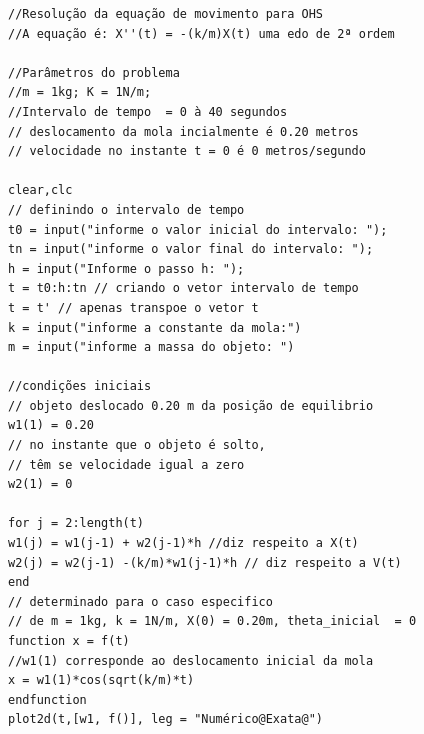 \begin{verbatim}
//Resolução da equação de movimento para OHS
//A equação é: X''(t) = -(k/m)X(t) uma edo de 2ª ordem

//Parâmetros do problema
//m = 1kg; K = 1N/m; 
//Intervalo de tempo  = 0 à 40 segundos 
// deslocamento da mola incialmente é 0.20 metros
// velocidade no instante t = 0 é 0 metros/segundo

clear,clc
// definindo o intervalo de tempo
t0 = input("informe o valor inicial do intervalo: ");
tn = input("informe o valor final do intervalo: ");
h = input("Informe o passo h: ");
t = t0:h:tn // criando o vetor intervalo de tempo
t = t' // apenas transpoe o vetor t
k = input("informe a constante da mola:")
m = input("informe a massa do objeto: ")

//condições iniciais
// objeto deslocado 0.20 m da posição de equilibrio
w1(1) = 0.20 
// no instante que o objeto é solto, 
// têm se velocidade igual a zero
w2(1) = 0 

for j = 2:length(t)
w1(j) = w1(j-1) + w2(j-1)*h //diz respeito a X(t)
w2(j) = w2(j-1) -(k/m)*w1(j-1)*h // diz respeito a V(t)
end
// determinado para o caso especifico 
// de m = 1kg, k = 1N/m, X(0) = 0.20m, theta_inicial  = 0
function x = f(t)
//w1(1) corresponde ao deslocamento inicial da mola
x = w1(1)*cos(sqrt(k/m)*t) 
endfunction
plot2d(t,[w1, f()], leg = "Numérico@Exata@")
\end{verbatim}